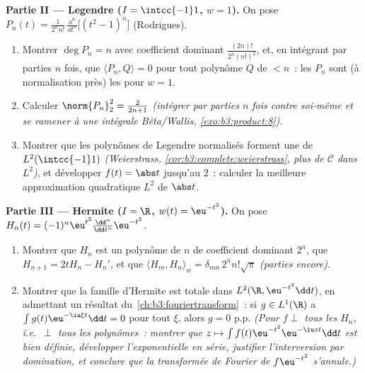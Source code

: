 \begin{problem}
\medskip
\noindent\textbf{Partie II --- Legendre ($I = \intcc{-1}1$, $w
= 1$).} On pose $P_n(t) = \frac{1}{2^nn!}\,\frac{\dd^n}{\dd
t^n}\bigl[(t^2 - 1)^n\bigr]$ (Rodrigues).
\begin{enumerate}[resume]
  \item Montrer $\deg P_n = n$ avec coefficient dominant
        $\frac{(2n)!}{2^n(n!)^2}$, et, en intégrant par
        parties $n$ fois, que $\langle P_n, Q\rangle = 0$
        pour tout polynôme $Q$ de  $< n$~: les $P_n$
        sont (à normalisation près) les 
        pour $w = 1$.
  \item Calculer $\norm{P_n}_2^2 = \frac{2}{2n+1}$
        \emph{(intégrer par parties $n$ fois contre soi-même
        et se ramener à une intégrale Bêta/Wallis,
        \cref{exo:b3:product:8})}.
  \item Montrer que les polynômes de Legendre normalisés
        forment une  de $L^2(\intcc{-1}1)$
        \emph{(Weierstrass, \cref{cor:b3:complete:weierstrass},
        plus  de $\mathcal C$ dans $L^2$)}, et
        développer $f(t) = \abs t$ jusqu'au  $2$~:
        calculer la meilleure approximation quadratique $L^2$
        de $\abs t$.
\end{enumerate}

\medskip
\noindent\textbf{Partie III --- Hermite ($I = \R$, $w(t) =
\eu^{-t^2}$).} On pose $H_n(t) =
(-1)^n\eu^{t^2}\frac{\dd^n}{\dd t^n}\eu^{-t^2}$.
\begin{enumerate}[resume]
  \item Montrer que $H_n$ est un polynôme de  $n$ de
        coefficient dominant $2^n$, que $H_{n+1} = 2tH_n -
        H_n'$, et que $\langle H_m, H_n\rangle_w =
        \delta_{mn}\,2^nn!\sqrt\pi$ \emph{(parties encore)}.
  \item Montrer que la famille d'Hermite est totale dans
        $L^2(\R, \eu^{-t^2}\dd t)$, en admettant un résultat
        du~\cref{ch:b3:fouriertransform}~: si $g \in L^1(\R)$
        a $\int g(t)\eu^{-\iu\xi t}\dd t = 0$ pour tout $\xi$,
        alors $g = 0$ p.p. \emph{(Pour $f \perp$ tous les
        $H_n$, i.e.\ $\perp$ tous les polynômes~: montrer que
        $z \mapsto \int f(t)\eu^{-t^2}\eu^{-\iu zt}\dd t$ est
        bien définie, développer l'exponentielle en série,
        justifier l'interversion par domination, et conclure
        que la transformée de Fourier de $f\eu^{-t^2}$
        s'annule.)}
\end{enumerate}


\end{problem}
